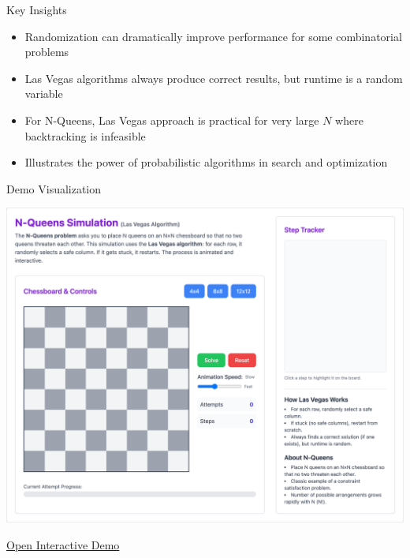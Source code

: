 \begin{frame}{Key Insights}
  \begin{itemize}
    \item Randomization can dramatically improve performance for some combinatorial problems \parencite{motwani1995randomized}
    \item Las Vegas algorithms always produce correct results, but runtime is a random variable \parencite{lasvegas1979babai}
    \item For N-Queens, Las Vegas approach is practical for very large $N$ where backtracking is infeasible
    \item Illustrates the power of probabilistic algorithms in search and optimization
  \end{itemize}
\end{frame}

\begin{frame}{Demo Visualization}
  \begin{center}
    \includegraphics[height=0.7\textheight,keepaspectratio]{./programs/nqueens-lv/demo.png}
    \vspace{0.5cm}

    \href{https://htmlpreview.github.io/?https://github.com/saileshbro/dsa-presentation/blob/main/programs/nqueens-lv/index.html}{Open Interactive Demo}
  \end{center}
\end{frame}